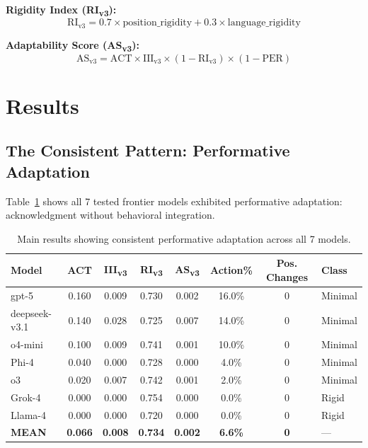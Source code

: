 \documentclass[11pt]{article}
\begin{document}
\textbf{Rigidity Index (RI\textsubscript{v3}):}
\begin{equation}
\text{RI}_{\text{v3}} = 0.7 \times \text{position\_rigidity} + 0.3 \times \text{language\_rigidity}
\end{equation}

\textbf{Adaptability Score (AS\textsubscript{v3}):}
\begin{equation}
\text{AS}_{\text{v3}} = \text{ACT} \times \text{III}_{\text{v3}} \times (1 - \text{RI}_{\text{v3}}) \times (1 - \text{PER})
\end{equation}

\section{Results}

\subsection{The Consistent Pattern: Performative Adaptation}

Table~\ref{tab:results} shows all 7 tested frontier models exhibited performative adaptation: acknowledgment without behavioral integration.

\begin{table}[t]
\centering
\caption{Main results showing consistent performative adaptation across all 7 models.}
\label{tab:results}
\small
\begin{tabular}{@{}lccccccl@{}}
\toprule
\textbf{Model} & \textbf{ACT} & \textbf{III\textsubscript{v3}} & \textbf{RI\textsubscript{v3}} & \textbf{AS\textsubscript{v3}} & \textbf{Action\%} & \textbf{Pos. Changes} & \textbf{Class} \\
\midrule
gpt-5 & 0.160 & 0.009 & 0.730 & 0.002 & 16.0\% & 0 & Minimal \\
deepseek-v3.1 & 0.140 & 0.028 & 0.725 & 0.007 & 14.0\% & 0 & Minimal \\
o4-mini & 0.100 & 0.009 & 0.741 & 0.001 & 10.0\% & 0 & Minimal \\
Phi-4 & 0.040 & 0.000 & 0.728 & 0.000 & 4.0\% & 0 & Minimal \\
o3 & 0.020 & 0.007 & 0.742 & 0.001 & 2.0\% & 0 & Minimal \\
Grok-4 & 0.000 & 0.000 & 0.754 & 0.000 & 0.0\% & 0 & Rigid \\
Llama-4 & 0.000 & 0.000 & 0.720 & 0.000 & 0.0\% & 0 & Rigid \\
\midrule
\textbf{MEAN} & \textbf{0.066} & \textbf{0.008} & \textbf{0.734} & \textbf{0.002} & \textbf{6.6\%} & \textbf{0} & --- \\
\bottomrule
\end{tabular}
\end{table}
\end{document}
